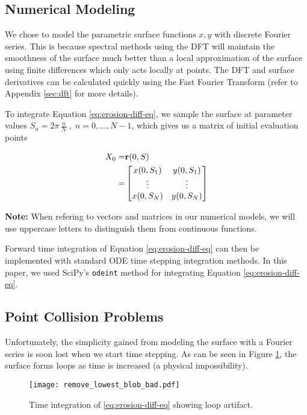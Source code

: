 \subsection*{Numerical Modeling}\label{sec:numerical-modeling}

We chose to model the parametric surface functions $x, y$ with discrete Fourier series. This is because spectral methods using the DFT will maintain the smoothness of the surface much better than a local approximation of the surface using finite differences which only acts locally at points. The DFT and surface derivatives can be calculated quickly using the Fast Fourier Transform (refer to Appendix \ref{sec:dft} for more details).

To integrate Equation \ref{eq:erosion-diff-eq}, we sample the surface at parameter values $S_n = 2 \pi \, \frac{n}{N} \; , \; n = 0, \dotsc, N-1$, which gives us a matrix of initial evaluation points

\begin{align*} 
  X_0 =& \bvec{r}\paren{0, S}\\
  =& \begin{bmatrix}
    x(0, S_1)& y(0, S_1)\\
    \vdots& \vdots\\
    x(0, S_N)& y(0, S_N)\\ 
  \end{bmatrix}
\end{align*}

\textbf{Note:} When refering to vectors and matrices in our numerical models, we will use uppercase letters to distinguish them from continuous functions.

Forward time integration of Equation \ref{eq:erosion-diff-eq} can then be implemented with standard ODE time stepping integration methods. In this paper, we used SciPy's {\tt odeint} method for integrating Equation \ref{eq:erosion-diff-eq}.

\subsection*{Point Collision Problems}

Unfortunately, the simplicity gained from modeling the surface with a Fourier series is soon lost when we start time stepping. As can be seen in Figure \ref{fig:remove-lowest-blob-bad}, the surface forms loops as time is increased (a physical impossibility).

\begin{figure}[H]
    \begin{center}
      \texttt{[image: remove\_lowest\_blob\_bad.pdf]}
    \end{center}
  \vspace{-.2in} %
  \caption{Time integration of \ref{eq:erosion-diff-eq} showing loop artifact.\label{fig:remove-lowest-blob-bad}}
\end{figure}

